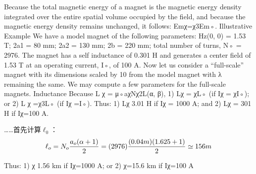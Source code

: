 Because the total magnetic energy of a magnet is the magnetic energy density
integrated over the entire spatial volume occupied by the field, and because the
magnetic energy density remains unchanged, it follows: Emχ=χ3Em◦.
Illustrative Example
We have a model magnet of the following parameters: Hz(0, 0) = 1.53 T; 2a1 =
80 mm; 2a2 = 130 mm; 2b = 220 mm; total number of turns, N◦ = 2976. The
magnet has a self inductance of 0.301 H and generates a center field of 1.53 T at
an operating current, I◦, of 100 A. Now let us consider a “full-scale” magnet with
its dimensions scaled by 10 from the model magnet with λ remaining the same.
We may compute a few parameters for the full-scale magnets.
Inductance Because L
χ = μ◦aχNχ2L(α, β), 1) Lχ = χL◦ (if Iχ = χI◦); or 2)
L
χ =χ3L◦ (if Iχ =I◦). Thus: 1) Lχ 3.01 H if Iχ = 1000 A; and 2) Lχ = 301 H if
Iχ=100 A.

……首先计算$\ell_0$：
$$
\ell_{o}=N_{o}\frac{a_{o}(\alpha+1)}{2}\\
=(2976)\frac{(0.04m)(1.625+1)}{2}\simeq156m\\
$$

Thus: 1) χ 1.56 km if Iχ=1000 A; or 2) χ=15.6 km if Iχ=100 A
\newpage


